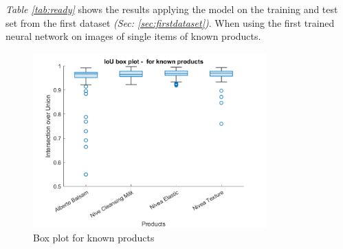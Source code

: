 \begin{table}[h]
\caption{Detection results when tested on the training and test set from the first dataset \textit{(Sec: \ref{sec:firstdataset})} using the first neural network}
\label{tab:ready}
\end{table}

\textit{Table \ref{tab:ready}} shows the results applying the model on the training and test set from the first dataset \textit{(Sec: \ref{sec:firstdataset})}. When using the first trained neural network on images of single items of known products.
\clearpage

\begin{figure}[h]
 \centering
 \includegraphics[width=0.8\textwidth]{graphics/results/boxplotForKnownProducts.png}
 \caption{Box plot for known products}
 \label{fig:boxknownproducts}
\end{figure}

